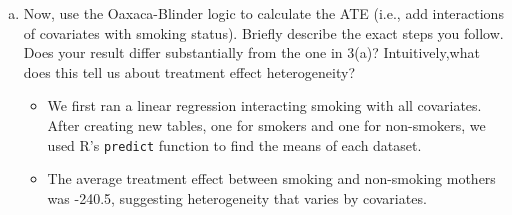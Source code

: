 \documentclass{article}
\begin{document}
\begin{enumerate}[(a)]
\begin{itemize}
    \end{itemize}
    \item Now, use the Oaxaca-Blinder logic to calculate the ATE (i.e., add interactions of covariates with smoking status). Briefly describe the exact steps you follow. Does your result differ substantially from the one in 3(a)? Intuitively,what does this tell us about treatment effect heterogeneity?
    \begin{itemize}
        \item We first ran a linear regression interacting smoking with all covariates. After creating new tables, one for smokers and one for non-smokers, we used R's \verb|predict| function to find the means of each dataset.
        \item The average treatment effect between smoking and non-smoking mothers was -240.5, suggesting heterogeneity that varies by covariates.
    \end{itemize}
\end{enumerate}
\end{document}

